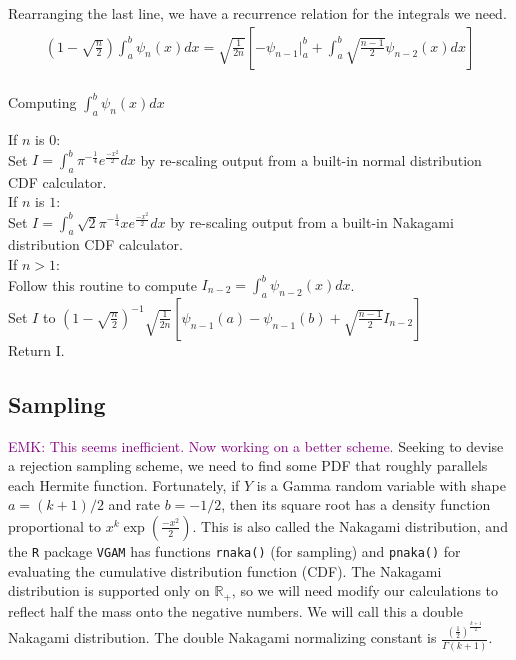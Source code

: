 \documentclass{article}
\newcommand\EMK[1]{\textcolor{purple}{EMK: #1}}
\begin{document}
Rearranging the last line, we have a recurrence relation for the integrals we need.
\begin{align*}
(1-\sqrt{\frac{n}{2}})\int_a^b \psi_n(x)dx =\sqrt{\frac{1}{2n}} \left[ -\psi_{n-1} \biggr\rvert_a^b + \int_a^b \sqrt{\frac{n-1}{2}}\psi_{n-2}(x)dx\right] \\
\end{align*}

\begin{algorithm}[h]
\caption{Computing $\int_a^b \psi_n(x)dx$}
If $n$ is $0$:\\
\Indp
Set $I=\int_a^b \pi^{-\frac{1}{4}}e^{\frac{-x^2}{2}} dx$ by re-scaling output from a built-in normal distribution CDF calculator.\\
\Indm
If $n$ is $1$:\\
\Indp
Set $I=\int_a^b \sqrt{2} \pi^{-\frac{1}{4}}xe^{\frac{-x^2}{2}}dx$ by re-scaling output from a built-in Nakagami distribution CDF calculator.\\
\Indm
If $n>1$:\\
\Indp
Follow this routine to compute $I_{n-2}=\int_a^b \psi_{n-2}(x)dx$.\\
Set $I$ to $(1-\sqrt{\frac{n}{2}})^{-1}\sqrt{\frac{1}{2n}} \left[ \psi_{n-1}(a)-\psi_{n-1}(b) + \sqrt{\frac{n-1}{2}}I_{n-2}\right]$\\
\Indm
Return I.\\
\Indp
\Indm
\end{algorithm}




\subsection{Sampling}
\EMK{This seems inefficient. Now working on a better scheme.}
Seeking to devise a rejection sampling scheme, we need to find some PDF that roughly parallels each Hermite function. Fortunately, if $Y$ is a Gamma random variable with shape $a = (k+1)/2$ and rate $b=-1/2$, then its square root has a density function proportional to $x^k\exp(\frac{-x^2}{2})$. This is also called the Nakagami distribution, and the \texttt{R} package \texttt{VGAM} has functions \texttt{rnaka()} (for sampling) and \texttt{pnaka()} for evaluating the cumulative distribution function (CDF). The Nakagami distribution is supported only on $\mathbb{R}_+$, so we will need modify our calculations to reflect half the mass onto the negative numbers. We will call this a double Nakagami distribution. The double Nakagami normalizing constant is $\frac{(\frac{1}{2})^{\frac{k+1}{2}}}{ \Gamma(k+1)}$.
\end{document}
